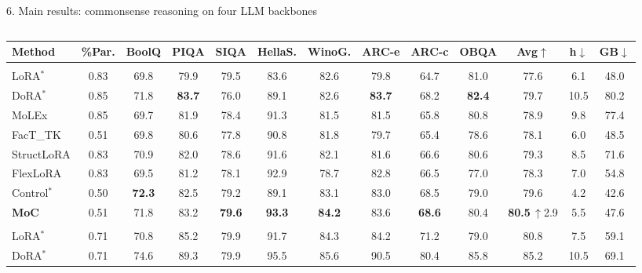 \documentclass[final]{beamer}
\newlength{\widewidth}
\newcommand{\up}[1]{\,{\color{mocup}\scriptsize$\uparrow$#1}}
\begin{document}
\begin{frame}[t]
\begin{columns}[t]
\begin{column}{\widewidth}
\begin{block}{6. Main results: commonsense reasoning on four LLM backbones}
    \begin{table}
      \centering
      \footnotesize
      \setlength{\tabcolsep}{0.32em}
      \renewcommand{\arraystretch}{1.15}
      \begin{columns}[t,totalwidth=\linewidth]
        \begin{column}{0.495\linewidth}
          \centering
          \begin{tabular}{@{}l c cccccccc >{\columncolor{neuripsrule!30}}c cc@{}}
            \toprule
            \textbf{Method} & \textbf{\%Par.} & \textbf{BoolQ} & \textbf{PIQA} & \textbf{SIQA} & \textbf{HellaS.} & \textbf{WinoG.} & \textbf{ARC-e} & \textbf{ARC-c} & \textbf{OBQA} & \textbf{Avg$\uparrow$} & \textbf{h$\downarrow$} & \textbf{GB$\downarrow$} \\
            \midrule
            \rowcolor{grouprow}\multicolumn{13}{l}{\textbf{LLaMA2-7B}} \\
            LoRA$^{*}$ & 0.83 & 69.8 & 79.9 & 79.5 & 83.6 & 82.6 & 79.8 & 64.7 & 81.0 & 77.6 & 6.1 & 48.0 \\
            DoRA$^{*}$ & 0.85 & 71.8 & \textbf{83.7} & 76.0 & 89.1 & 82.6 & \textbf{83.7} & 68.2 & \textbf{82.4} & 79.7 & 10.5 & 80.2 \\
            MoLEx & 0.85 & 69.7 & 81.9 & 78.4 & 91.3 & 81.5 & 81.5 & 65.8 & 80.8 & 78.9 & 9.8 & 77.4 \\
            FacT\_TK & 0.51 & 69.8 & 80.6 & 77.8 & 90.8 & 81.8 & 79.7 & 65.4 & 78.6 & 78.1 & 6.0 & 48.5 \\
            StructLoRA & 0.83 & 70.9 & 82.0 & 78.6 & 91.6 & 82.1 & 81.6 & 66.6 & 80.6 & 79.3 & 8.5 & 71.6 \\
            FlexLoRA & 0.83 & 69.5 & 81.2 & 78.1 & 92.9 & 78.7 & 82.8 & 66.5 & 77.0 & 78.3 & 7.0 & 54.8 \\
            Control$^{*}$ & 0.50 & \textbf{72.3} & 82.5 & 79.2 & 89.1 & 83.1 & 83.0 & 68.5 & 79.0 & 79.6 & 4.2 & 42.6 \\
            \rowcolor{mocrow}\textbf{MoC} & 0.51 & 71.8 & 83.2 & \textbf{79.6} & \textbf{93.3} & \textbf{84.2} & 83.6 & \textbf{68.6} & 80.4 & \textbf{80.5}\up{2.9} & 5.5 & 47.6 \\
            \midrule
            \rowcolor{grouprow}\multicolumn{13}{l}{\textbf{LLaMA3-8B}} \\
            LoRA$^{*}$ & 0.71 & 70.8 & 85.2 & 79.9 & 91.7 & 84.3 & 84.2 & 71.2 & 79.0 & 80.8 & 7.5 & 59.1 \\
            DoRA$^{*}$ & 0.71 & 74.6 & 89.3 & 79.9 & 95.5 & 85.6 & 90.5 & 80.4 & 85.8 & 85.2 & 10.5 & 69.1 \\

\end{tabular}
\end{column}
\end{columns}
\end{table}
\end{block}
\end{column}
\end{columns}
\end{frame}
\end{document}
